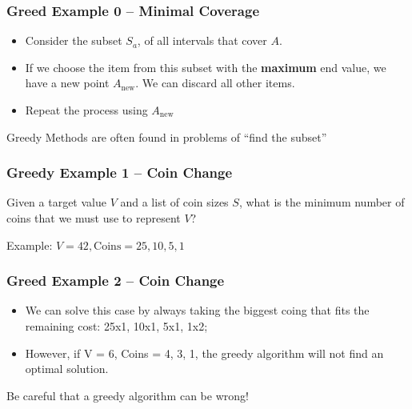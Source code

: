 \documentclass{beamer}
\begin{document}
\begin{frame}
  \frametitle{Greed Example 0 -- Minimal Coverage}

  \begin{itemize}
  \item Consider the subset $S_a$, of all intervals that cover $A$.
    \bigskip

  \item If we choose the item from this subset with the {\bf maximum} end value,
    we have a new point $A_{\text{new}}$. We can discard all other items.
    \bigskip

  \item Repeat the process using $A_{\text{new}}$
  \end{itemize}

  \bigskip

  \begin{block}{}
    Greedy Methods are often found in problems of ``find the subset''
  \end{block}
\end{frame}



\begin{frame}
  \frametitle{Greedy Example 1 -- Coin Change}

  Given a target value $V$ and a list of coin sizes $S$, what is the
  minimum number of coins that we must use to represent $V$?

  \bigskip

  \begin{block}{Example:}
    $V = 42, \text{Coins} = 25, 10, 5, 1$\\
  \end{block}
\end{frame}

\begin{frame}
  \frametitle{Greed Example 2 -- Coin Change}

  \begin{itemize}

  \item We can solve this case by always taking the biggest coing that fits
    the remaining cost: 25x1, 10x1, 5x1, 1x2;

  \medskip

  \item However, if V = 6, Coins = 4, 3, 1, the greedy algorithm will
    \alert{not} find an optimal solution.

  \end{itemize}

  \bigskip

  \begin{center}
    Be careful that \alert{a greedy algorithm can be wrong!}
  \end{center}
\end{frame}
\end{document}
